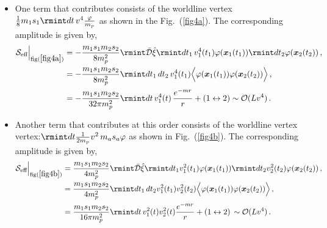 \begin{itemize}
    \item One term that contributes consists of the worldline vertex $\frac{1}{8}m_1 s_1\rmint dt \,v^4\frac{\varphi}{m_p}$ as shown in the Fig.~(\ref{fig4a}). The corresponding amplitude is given by,
    \begin{align}
        \begin{split}
              \mathcal{S}_{\text{eff}}\Big|_{\text{fig}(\ref{fig4a})}&=-\frac{m_1 s_1 m_2 s_2 }{8m_p^2}\rmint\Bar{\mathcal{D}}\Hat{\xi}\rmint dt_1\,v_1^4(t_1) \varphi(\boldsymbol{x}_1(t_1))\rmint dt_2 \varphi(\boldsymbol{x}_2(t_2))\,,\\ &
            =-\frac{m_1 s_1 m_2 s_2 }{8m_p^2}\rmint dt_1 \,dt_2\,v_1^4(t_1)\Big\langle\varphi(\boldsymbol{x}_1(t_1))\varphi(\boldsymbol{x}_2(t_2))\Big\rangle\,,\\ &
            =-\frac{m_1 s_1 m_2 s_2}{32\pi m_p^2}\rmint dt \,v_1^4(t)\,\frac{e^{-mr}}{r}+(1\leftrightarrow2)\sim \mathcal{O}(Lv^4)\,.
        \end{split}
    \end{align}
    \item Another term that contributes at this order consists of the worldline vertex vertex:$\rmint dt \frac{1}{2m_p}v^2\,m_a s_a \varphi$ as shown in Fig.~(\ref{fig4b}). The corresponding amplitude is given by,
    \begin{align}
        \begin{split}
              \mathcal{S}_{\text{eff}}\Big|_{\text{fig}(\ref{fig4b})}&=\frac{m_1 s_1 m_2 s_2}{4m_p^2}\rmint\Bar{\mathcal{D}}\Hat{\xi}\rmint dt_1 v_1^2(t_1)\varphi(\boldsymbol{x}_1(t_1))\rmint dt_2 v_2^2(t_2)\varphi(\boldsymbol{x}_2(t_2))\,,\\ &
            =\frac{m_1 s_1 m_2 s_2}{4m_p^2}\rmint dt_1 \, dt_2 v_1^2(t_1)v_2^2(t_2)\Big\langle\varphi(\boldsymbol{x}_1(t_1))\varphi(\boldsymbol{x}_2(t_2))\Big\rangle\,,\\ &
            =\frac{m_1 s_1 m_2 s_2}{16 \pi m_p^2}\rmint dt\,v_1^2(t)v_2^2(t)\frac{e^{-mr}}{r}+(1\leftrightarrow 2)\,\sim \mathcal{O}(Lv^4)\,.
        \end{split}
    \end{align}
\end{itemize} 
